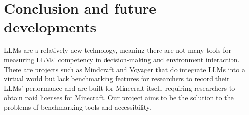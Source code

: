 \documentclass{article}
\begin{document}
\section{Conclusion and future developments}
LLMs are a relatively new technology, meaning there are not many tools for measuring LLMs' competency in decision-making and environment interaction.
There are projects such as Mindcraft and Voyager that do integrate LLMs into a virtual world but lack benchmarking features for researchers to record their LLMs' performance and are built for Minecraft itself, requiring researchers to obtain paid licenses for Minecraft.
Our project aims to be the solution to the problems of benchmarking tools and accessibility. 







\end{document}
